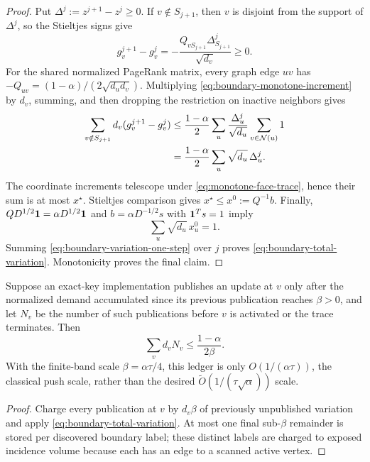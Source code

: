 \begin{proof}
Put $\Delta^j:=z^{j+1}-z^j\geq0$.  If $v\notin S_{j+1}$, then $v$ is
disjoint from the support of $\Delta^j$, so the Stieltjes signs give
\begin{equation}
 g_v^{j+1}-g_v^j
 =-\frac{Q_{vS_{j+1}}\Delta^j_{S_{j+1}}}{\sqrt{d_v}}
 \geq0.
 \label{eq:boundary-monotone-increment}
\end{equation}
For the shared normalized PageRank matrix, every graph edge $uv$ has
$-Q_{uv}=(1-\alpha)/(2\sqrt{d_ud_v})$.  Multiplying
\cref{eq:boundary-monotone-increment} by $d_v$, summing, and then dropping the
restriction on inactive neighbors gives
\begin{align}
 \sum_{v\notin S_{j+1}}d_v(g_v^{j+1}-g_v^j)
 &\leq\frac{1-\alpha}{2}
   \sum_u\frac{\Delta_u^j}{\sqrt{d_u}}
   \sum_{v\in\mathcal N(u)}1 \notag\\
 &=\frac{1-\alpha}{2}\sum_u\sqrt{d_u}\,\Delta_u^j.
 \label{eq:boundary-variation-one-step}
\end{align}
The coordinate increments telescope under
\cref{eq:monotone-face-trace}, hence their sum is at most $x^\star$.
Stieltjes comparison gives $x^\star\leq x^0:=Q^{-1}b$.  Finally,
$QD^{1/2}\mathbf{1}=\alpha D^{1/2}\mathbf{1}$ and
$b=\alpha D^{-1/2}s$ with $\mathbf{1}^Ts=1$ imply
\begin{equation}
 \sum_u\sqrt{d_u}\,x_u^0=1.
 \label{eq:ppr-normalized-mass}
\end{equation}
Summing \cref{eq:boundary-variation-one-step} over $j$ proves
\cref{eq:boundary-total-variation}.  Monotonicity proves the final claim.
\end{proof}

\begin{corollary}
\label{cor:additive-key-ledger}
Suppose an exact-key implementation publishes an update at $v$ only after
the normalized demand accumulated since its previous publication reaches
$\beta>0$, and let $N_v$ be the number of such publications before $v$ is
activated or the trace terminates.  Then
\begin{equation}
 \sum_v d_vN_v\leq\frac{1-\alpha}{2\beta}.
 \label{eq:additive-key-publications}
\end{equation}
With the finite-band scale $\beta=\alpha\tau/4$, this ledger is only
$O(1/(\alpha\tau))$, the classical push scale, rather than the desired
$\widetilde O(1/(\tau\sqrt\alpha))$ scale.
\end{corollary}

\begin{proof}
Charge every publication at $v$ by $d_v\beta$ of previously unpublished
variation and apply \cref{eq:boundary-total-variation}.  At most one final
sub-$\beta$ remainder is stored per discovered boundary label; these distinct
labels are charged to exposed incidence volume because each has an edge to a
scanned active vertex.
\end{proof}

